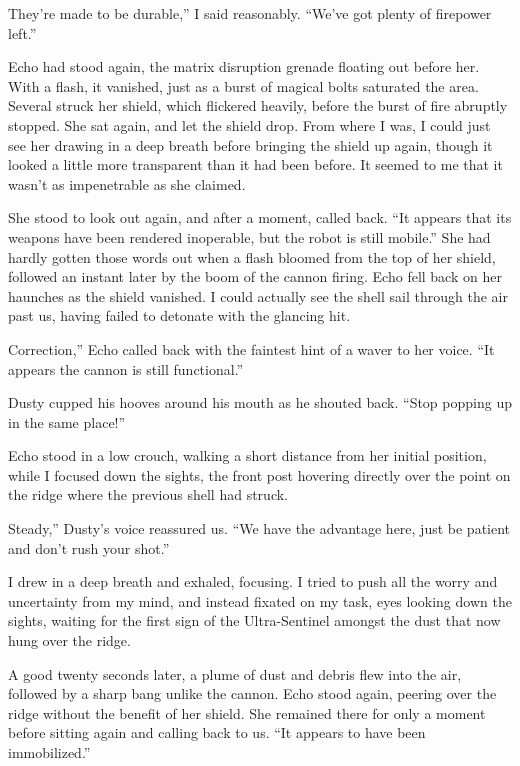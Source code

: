 \leavevmode{}They’re made to be durable,” I said reasonably. “We’ve got plenty of firepower left.”

Echo had stood again, the matrix disruption grenade floating out before her. With a flash, it vanished, just as a burst of magical bolts saturated the area. Several struck her shield, which flickered heavily, before the burst of fire abruptly stopped. She sat again, and let the shield drop. From where I was, I could just see her drawing in a deep breath before bringing the shield up again, though it looked a little more transparent than it had been before. It seemed to me that it wasn’t as impenetrable as she claimed.

She stood to look out again, and after a moment, called back. “It appears that its weapons have been rendered inoperable, but the robot is still mobile.” She had hardly gotten those words out when a flash bloomed from the top of her shield, followed an instant later by the boom of the cannon firing. Echo fell back on her haunches as the shield vanished. I could actually see the shell sail through the air past us, having failed to detonate with the glancing hit.

\leavevmode{}Correction,” Echo called back with the faintest hint of a waver to her voice. “It appears the cannon is still functional.”

Dusty cupped his hooves around his mouth as he shouted back. “Stop popping up in the same place!”

Echo stood in a low crouch, walking a short distance from her initial position, while I focused down the sights, the front post hovering directly over the point on the ridge where the previous shell had struck.

\leavevmode{}Steady,” Dusty’s voice reassured us. “We have the advantage here, just be patient and don’t rush your shot.”

I drew in a deep breath and exhaled, focusing. I tried to push all the worry and uncertainty from my mind, and instead fixated on my task, eyes looking down the sights, waiting for the first sign of the Ultra-Sentinel amongst the dust that now hung over the ridge.

A good twenty seconds later, a plume of dust and debris flew into the air, followed by a sharp bang unlike the cannon. Echo stood again, peering over the ridge without the benefit of her shield. She remained there for only a moment before sitting again and calling back to us. “It appears to have been immobilized.”

